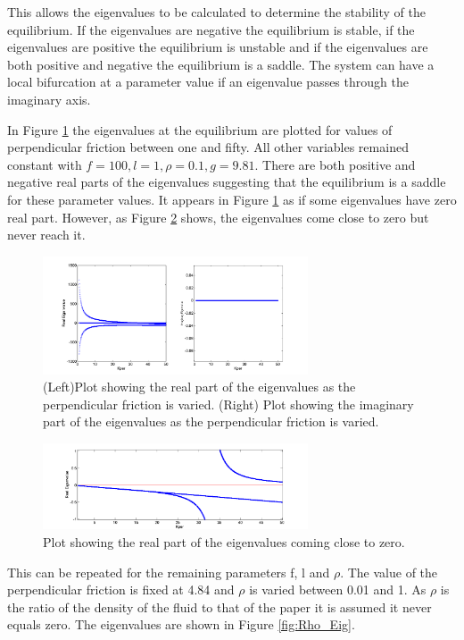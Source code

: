 This allows the eigenvalues to be calculated to determine the stability of the equilibrium. If the eigenvalues are negative the equilibrium is stable, if the eigenvalues are positive the equilibrium is unstable and if the eigenvalues are both positive and negative the equilibrium is a saddle. The system can have a local bifurcation at a parameter value if an eigenvalue passes through the imaginary axis. 

In Figure \ref{fig:Kper_Eig} the eigenvalues at the equilibrium are plotted for values of perpendicular friction between one and fifty. All other variables remained constant with $f=100, l=1, \rho = 0.1, g = 9.81$. There are both positive and negative real parts of the eigenvalues suggesting that the equilibrium is a saddle for these parameter values. It appears in Figure \ref{fig:Kper_Eig} as if some eigenvalues have zero real part. However, as Figure \ref{fig:Kper_Eig2} shows, the eigenvalues come close to zero but never reach it. 

\begin{figure}[H]
\centering
\includegraphics[width=0.7\textwidth]{Kper_Eigenvalues.png}
\caption{\label{fig:Kper_Eig}(Left)Plot showing the real part of the eigenvalues as the perpendicular friction is varied. (Right) Plot showing the imaginary part of the eigenvalues as the perpendicular friction is varied.
}
\end{figure}

\begin{figure}[H]
\centering
\includegraphics[width=0.7\textwidth]{Kper_Eigenvalues2.png}
\caption{\label{fig:Kper_Eig2}Plot showing the real part of the eigenvalues coming close to zero.
}
\end{figure}


This can be repeated for the remaining parameters f, l and $\rho$. 
The value of the perpendicular friction is fixed at 4.84 and $\rho$ is varied between 0.01 and 1. As $\rho$ is the ratio of the density of the fluid to that of the paper it is assumed it never equals zero. The eigenvalues are shown in Figure \ref{fig:Rho_Eig}. 

